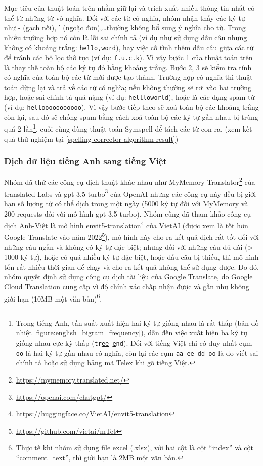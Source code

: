 Mục tiêu của thuật toán trên nhằm giữ lại và trích xuất nhiều thông tin nhất có thể từ những từ vô nghĩa. Đối với các từ có nghĩa, nhóm nhận thấy các ký tự như - (gạch nối), ' (ngoặc đơn),\dots thường không bổ sung ý nghĩa cho từ. Trong nhiều trường hợp nó còn là lỗi sai chính tả (ví dụ như sử dụng dấu câu nhưng không có khoảng trắng: \texttt{hello,word}), hay việc cố tình thêm dấu câu giữa các từ để tránh các bộ lọc thô tục (ví dụ: \texttt{f.u.c.k}). Vì vậy bước 1 của thuật toán trên là thay thế toàn bộ các ký tự đó bằng khoảng trắng. Bước 2, 3 sẽ kiểm tra tính có nghĩa của toàn bộ các từ mới được tạo thành. Trường hợp có nghĩa thì thuật toán dừng lại và trả về các từ có nghĩa; nếu không thường sẽ rơi vào hai trường hợp, hoặc sai chính tả quá nặng (ví dụ: \texttt{hel\textvisiblespace llowo\textvisiblespace rld}), hoặc là các dạng spam từ (ví dụ: \texttt{hellooooooooooo}). Vì vậy bước tiếp theo sẽ xoá toàn bộ các khoảng trắng còn lại, sau đó sẽ chống spam bằng cách xoá toàn bộ các ký tự gần nhau bị trùng quá 2 lần\footnote{Trong tiếng Anh, tần suất xuất hiện hai ký tự giống nhau là rất thấp (bản đồ nhiệt \ref{figure:english_bigram_frequency}), dẫn đến việc xuất hiện ba ký tự giống nhau cực kỳ thấp (\texttt{tr\underline{ee} \underline{e}nd}). Đối với tiếng Việt chỉ có duy nhất cụm \texttt{oo} là hai ký tự gần nhau có nghĩa, còn lại các cụm \texttt{aa ee dd oo} là do viết sai chính tả hoặc sử dụng bảng mã Telex khi gõ tiếng Việt.}, cuối cùng dùng thuật toán Symspell để tách các từ con ra. (xem kết quả thử nghiệm tại \ref{spelling-corrector-algorithm-result})

\subsubsection{Dịch dữ liệu tiếng Anh sang tiếng Việt}
Nhóm đã thử các công cụ dịch thuật khác nhau như MyMemory Translator\footnote{\url{https://mymemory.translated.net/}} của translated Labs và gpt-3.5-turbo\footnote{\url{https://openai.com/chatgpt/}} của OpenAI nhưng các công cụ này đều bị giới hạn số lượng từ có thể dịch trong một ngày (5000 ký tự đối với MyMemory và 200 requests đối với mô hình gpt-3.5-turbo). Nhóm cũng đã tham khảo công cụ dịch Anh-Việt là mô hình envit5-translation\footnote{\url{https://huggingface.co/VietAI/envit5-translation}} của VietAI (được xem là tốt hơn Google Translate vào năm 2022\footnote{\url{https://github.com/vietai/mTet}}), mô hình này cho ra kết quả dịch rất tốt đối với những câu ngắn và không có ký tự đặc biệt; nhưng đối với những câu đủ dài (> 1000 ký tự), hoặc có quá nhiều ký tự đặc biệt, hoặc dấu câu bị thiếu, thì mô hình tốn rất nhiều thời gian để chạy và cho ra kết quả không thể sử dụng được. Do đó, nhóm quyết định sử dụng công cụ dịch tài liệu của Google Translate, do Google Cloud Translation cung cấp vì độ chính xác chấp nhận được và gần như không giới hạn (10MB một văn bản)\footnote{Thực tế khi nhóm sử dụng file excel (.xlsx), với hai cột là cột ``index'' và cột ``comment\_text'', thì giới hạn là 2MB một văn bản.}.


